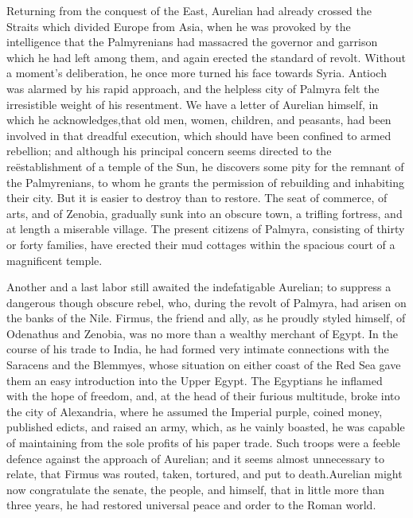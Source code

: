 Returning from the conquest of the East, Aurelian had already
crossed the Straits which divided Europe from Asia, when he was
provoked by the intelligence that the Palmyrenians had massacred
the governor and garrison which he had left among them, and again
erected the standard of revolt. Without a moment’s deliberation,
he once more turned his face towards Syria. Antioch was alarmed
by his rapid approach, and the helpless city of Palmyra felt the
irresistible weight of his resentment. We have a letter of
Aurelian himself, in which he acknowledges,\footnotemark[75] that old men,
women, children, and peasants, had been involved in that dreadful
execution, which should have been confined to armed rebellion;
and although his principal concern seems directed to the
reëstablishment of a temple of the Sun, he discovers some pity
for the remnant of the Palmyrenians, to whom he grants the
permission of rebuilding and inhabiting their city. But it is
easier to destroy than to restore. The seat of commerce, of arts,
and of Zenobia, gradually sunk into an obscure town, a trifling
fortress, and at length a miserable village. The present citizens
of Palmyra, consisting of thirty or forty families, have erected
their mud cottages within the spacious court of a magnificent
temple.


Another and a last labor still awaited the indefatigable
Aurelian; to suppress a dangerous though obscure rebel, who,
during the revolt of Palmyra, had arisen on the banks of the
Nile. Firmus, the friend and ally, as he proudly styled himself,
of Odenathus and Zenobia, was no more than a wealthy merchant of
Egypt. In the course of his trade to India, he had formed very
intimate connections with the Saracens and the Blemmyes, whose
situation on either coast of the Red Sea gave them an easy
introduction into the Upper Egypt. The Egyptians he inflamed with
the hope of freedom, and, at the head of their furious multitude,
broke into the city of Alexandria, where he assumed the Imperial
purple, coined money, published edicts, and raised an army,
which, as he vainly boasted, he was capable of maintaining from
the sole profits of his paper trade. Such troops were a feeble
defence against the approach of Aurelian; and it seems almost
unnecessary to relate, that Firmus was routed, taken, tortured,
and put to death.\footnotemark[76] Aurelian might now congratulate the senate,
the people, and himself, that in little more than three years, he
had restored universal peace and order to the Roman world.

